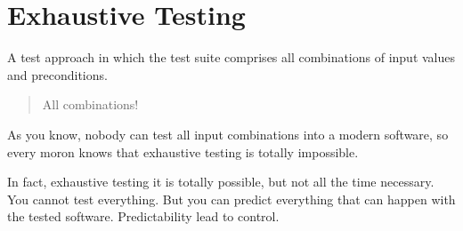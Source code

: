 \section{Exhaustive Testing}
\label{sec:Exhaustive Testing}

A test approach in which the test suite comprises all combinations of input values and preconditions.

\begin{quote}
All combinations!
\end{quote} 

As you know, nobody can test all input combinations into a modern software, so every moron knows that exhaustive testing is totally impossible.

In fact, exhaustive testing it is totally possible, but not all the time necessary. You cannot test everything. But you can predict everything that can happen with the tested software. Predictability lead to control.
